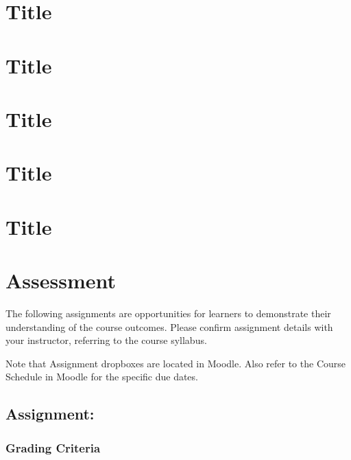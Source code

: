 \documentclass[
]{book}
\begin{document}
\hypertarget{title}{%
\chapter{Title}\label{title}}

\hypertarget{title-1}{%
\chapter{Title}\label{title-1}}

\hypertarget{title-2}{%
\chapter{Title}\label{title-2}}

\hypertarget{title-3}{%
\chapter{Title}\label{title-3}}

\hypertarget{title-4}{%
\chapter{Title}\label{title-4}}

\hypertarget{assessment-3}{%
\chapter*{Assessment}\label{assessment-3}}

The following assignments are opportunities for learners to demonstrate their understanding of the course outcomes. Please confirm assignment details with your instructor, referring to the course syllabus.

Note that Assignment dropboxes are located in Moodle. Also refer to the Course Schedule in Moodle for the specific due dates.

\hypertarget{assignment}{%
\section*{Assignment:}\label{assignment}}

\begin{assessment}

\end{assessment}

\hypertarget{grading-criteria-3}{%
\subsection*{Grading Criteria}\label{grading-criteria-3}}
\end{document}
